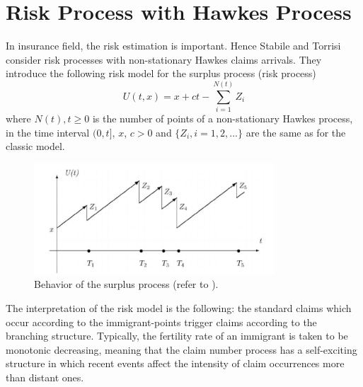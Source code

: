 \section{Risk Process with Hawkes Process}
In insurance field, the risk estimation is important. Hence Stabile and Torrisi consider risk processes with non-stationary Hawkes claims arrivals. They introduce the following risk model for the surplus process (risk process)
$$ U(t,x) = x + ct - \displaystyle\sum_{i=1}^{N(t)}Z_{i}$$
where ${N(t), t \geq 0} $ is the number of points of a non-stationary Hawkes process, in the time interval $(0, t]$, $x$, $c > 0$ and $\{Z_{i}, i = 1, 2, . . .\}$ are the same as for the classic model.

 \begin{figure}[H]
 	\centering
 	\includegraphics[width=0.8\textwidth ]{SurplusProcess.PNG}
 	\caption{Behavior of the surplus process (refer to \cite{SurplusProcess}).}
 	\label{Surplus_Process}
 \end{figure}
 The interpretation of the risk model is the following: the
 standard claims which occur according to the immigrant-points trigger claims according
 to the branching structure. Typically, the fertility rate of an immigrant is taken to
 be monotonic decreasing, meaning that the claim number process has a self-exciting
 structure in which recent events affect the intensity of claim occurrences more than
 distant ones.
